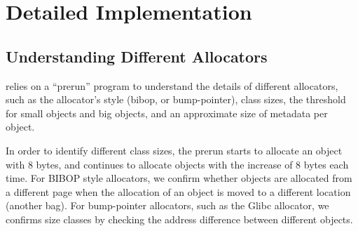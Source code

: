 \section{Detailed Implementation}

\label{sec:implement}





\subsection{Understanding Different Allocators}

\label{sec:understandingallocators}

\MP{} relies on a ``prerun'' program to understand the details of different allocators, such as the allocator's style (bibop, or bump-pointer), class sizes, the threshold for small objects and big objects, and an approximate size of metadata per object. 

In order to identify different class sizes, the prerun starts to allocate an object with 8 bytes, and continues to allocate  objects with the increase of 8 bytes each time. For BIBOP style allocators, we confirm whether objects are allocated from a different page when the allocation of an object is moved to a different location (another bag). 
For bump-pointer allocators, such as the Glibc allocator, we confirms size classes by checking the address difference between different objects. 


